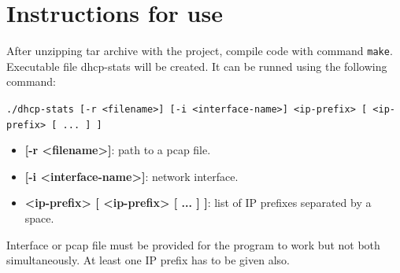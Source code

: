 \documentclass[english]{fitiel} %
\begin{document}
	\section{Instructions for use}
	After unzipping tar archive with the project, compile code with command \verb|make|. Executable file dhcp-stats will be created.
	It can be runned using the following command:
	\begin{center}
		\verb|./dhcp-stats [-r <filename>] [-i <interface-name>] <ip-prefix> [ <ip-prefix> [ ... ] ]|
	\end{center}
	\begin{itemize}
		\item \textbf{[-r <filename>]}: path to a pcap file.
		\item \textbf{[-i <interface-name>]}: network interface.
		\item \textbf{<ip-prefix> [ <ip-prefix> [ ... ] ]}: list of IP prefixes separated by a space. 
	\end{itemize}
	Interface or pcap file must be provided for the program to work but not both simultaneously. At least one IP prefix has to be given also.

	\newpage
	
	
\end{document}

